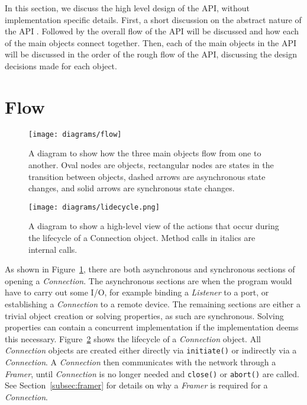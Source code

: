 In this section, we discuss the high level design of the API, without implementation specific details.
First, a short discussion on the abstract nature of the API .
Followed by the overall flow of the API will be discussed and how each of the main objects connect together.
Then, each of the main objects in the API will be discussed in the order of the rough flow of the API, discussing
the design decisions made for each object.

\section{Flow}\label{sec:flow}
\begin{figure}[h]
    \centering
    \texttt{[image: diagrams/flow]}
    \caption{A diagram to show how the three main objects flow from one to another.
    Oval nodes are objects, rectangular nodes are states in the transition between objects, dashed arrows are
    asynchronous state changes, and solid arrows are synchronous state changes.}
    \label{fig:flow}
\end{figure}

\begin{figure}[h]
    \centering
    \texttt{[image: diagrams/lidecycle.png]}
    \caption{A diagram to show a high-level view of the actions that occur during the lifecycle of a Connection object.
    Method calls in italics are internal calls.}
    \label{fig:lifecycle}
\end{figure}

As shown in Figure~\ref{fig:flow}, there are both asynchronous and synchronous sections of opening a \emph{Connection}.
The asynchronous sections are when the program would have to carry out some I/O, for example binding a \emph{Listener}
to a port, or establishing a \emph{Connection} to a remote device.
The remaining sections are either a trivial object creation or solving properties, as such are synchronous.
Solving properties can contain a concurrent implementation if the implementation deems this necessary.
Figure~\ref{fig:lifecycle} shows the lifecycle of a \emph{Connection} object.
All \emph{Connection} objects are created either directly via \texttt{initiate()} or indirectly via a \emph{Connection}.
A \emph{Connection} then communicates with the network through a \emph{Framer}, until \emph{Connection} is no longer
needed and \texttt{close()} or \texttt{abort()} are called.
See Section~\ref{subsec:framer} for details on why a \emph{Framer} is required for a \emph{Connection}.

